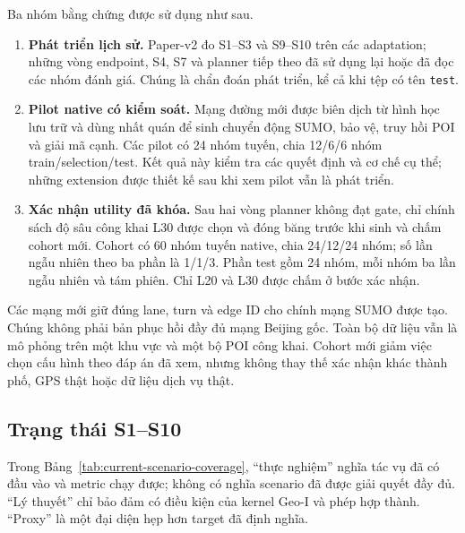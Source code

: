 Ba nhóm bằng chứng được sử dụng như sau.
\begin{enumerate}
  \item \textbf{Phát triển lịch sử.} Paper-v2 đo S1--S3 và S9--S10 trên các
  adaptation; những vòng endpoint, S4, S7 và planner tiếp theo đã sử dụng lại
  hoặc đã đọc các nhóm đánh giá. Chúng là chẩn đoán phát triển, kể cả khi tệp
  có tên \texttt{test}.
  \item \textbf{Pilot native có kiểm soát.} Mạng đường mới được biên dịch từ
  hình học lưu trữ và dùng nhất quán để sinh chuyển động SUMO, bảo vệ, truy hồi
  POI và giải mã cạnh. Các pilot có 24 nhóm tuyến, chia 12/6/6 nhóm
  train/selection/test. Kết quả này kiểm tra các quyết định và cơ chế cụ thể;
  những extension được thiết kế sau khi xem pilot vẫn là phát triển.
  \item \textbf{Xác nhận utility đã khóa.} Sau hai vòng planner không đạt gate,
  chỉ chính sách độ sâu công khai L30 được chọn và đóng băng trước khi sinh và
  chấm cohort mới. Cohort có 60 nhóm tuyến native, chia 24/12/24 nhóm; số lần
  ngẫu nhiên theo ba phần là 1/1/3. Phần test gồm 24 nhóm, mỗi nhóm ba lần
  ngẫu nhiên và tám phiên. Chỉ L20 và L30 được chấm ở bước xác nhận.
\end{enumerate}

Các mạng mới giữ đúng lane, turn và edge ID cho chính mạng SUMO được tạo.
Chúng không phải bản phục hồi đầy đủ mạng Beijing gốc. Toàn bộ dữ liệu vẫn là
mô phỏng trên một khu vực và một bộ POI công khai. Cohort mới giảm việc chọn
cấu hình theo đáp án đã xem, nhưng không thay thế xác nhận khác thành phố,
GPS thật hoặc dữ liệu dịch vụ thật.

\subsection{Trạng thái S1--S10}

Trong Bảng~\ref{tab:current-scenario-coverage}, ``thực nghiệm'' nghĩa tác vụ
đã có đầu vào và metric chạy được; không có nghĩa scenario đã được giải quyết
đầy đủ. ``Lý thuyết'' chỉ bảo đảm có điều kiện của kernel Geo-I và phép hợp
thành. ``Proxy'' là một đại diện hẹp hơn target đã định nghĩa.

